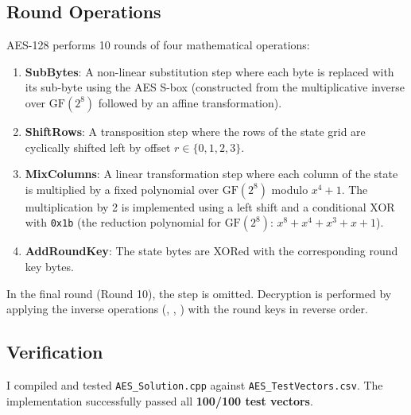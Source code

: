 \documentclass{article}
\begin{document}
\subsection{Round Operations}
AES-128 performs 10 rounds of four mathematical operations:
\begin{enumerate}
    \item \textbf{SubBytes}: A non-linear substitution step where each byte is replaced with its sub-byte using the AES S-box (constructed from the multiplicative inverse over $\text{GF}(2^8)$ followed by an affine transformation).
    \item \textbf{ShiftRows}: A transposition step where the rows of the state grid are cyclically shifted left by offset $r \in \{0, 1, 2, 3\}$.
    \item \textbf{MixColumns}: A linear transformation step where each column of the state is multiplied by a fixed polynomial over $\text{GF}(2^8)$ modulo $x^4 + 1$. The multiplication by 2 is implemented using a left shift and a conditional XOR with \texttt{0x1b} (the reduction polynomial for $\text{GF}(2^8)$: $x^8 + x^4 + x^3 + x + 1$).
    \item \textbf{AddRoundKey}: The state bytes are XORed with the corresponding round key bytes.
\end{enumerate}
In the final round (Round 10), the  step is omitted. Decryption is performed by applying the inverse operations (, , ) with the round keys in reverse order.

\subsection{Verification}
I compiled and tested \texttt{AES\_Solution.cpp} against \texttt{AES\_TestVectors.csv}. The implementation successfully passed all \textbf{100/100 test vectors}.
\end{document}
